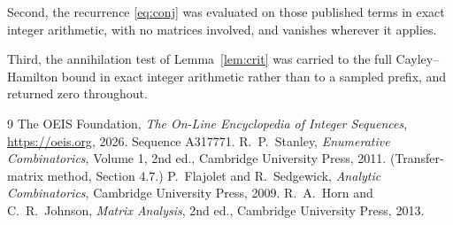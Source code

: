 \documentclass[11pt,a4paper]{article}
\theoremstyle{plain}
\theoremstyle{definition}
\begin{document}
Second, the recurrence \eqref{eq:conj} was evaluated on those published terms in exact
integer arithmetic, with no matrices involved, and vanishes wherever it applies.

Third, the annihilation test of Lemma~\ref{lem:crit} was carried to the full
Cayley--Hamilton bound in exact integer arithmetic rather than to a sampled prefix, and
returned zero throughout.

\begin{thebibliography}{9}
 The OEIS Foundation, \emph{The On-Line Encyclopedia of Integer
Sequences}, \url{https://oeis.org}, 2026. Sequence A317771.
 R.~P.~Stanley, \emph{Enumerative Combinatorics}, Volume 1, 2nd ed.,
Cambridge University Press, 2011. (Transfer-matrix method, Section 4.7.)
 P.~Flajolet and R.~Sedgewick, \emph{Analytic Combinatorics}, Cambridge
University Press, 2009.
 R.~A.~Horn and C.~R.~Johnson, \emph{Matrix Analysis}, 2nd ed., Cambridge
University Press, 2013.
\end{thebibliography}
\end{document}
